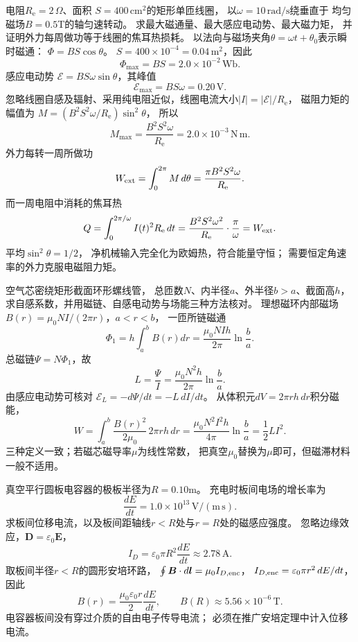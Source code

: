 \problemtext 电阻$R_{\mathrm e}=2\,\Omega$、面积
$S=400\,\mathrm{cm^2}$的矩形单匝线圈，
以$\omega=10\,\mathrm{rad/s}$绕垂直于
均匀磁场$B=0.5$T的轴匀速转动。
求最大磁通量、最大感应电动势、最大磁力矩，
并证明外力每周做功等于线圈的焦耳热损耗。
\workings
以法向与磁场夹角$\theta=\omega t+\theta_0$表示瞬时磁通：
$\Phi=BS\cos\theta$。
$S=400\times10^{-4}=0.04\,\mathrm{m^2}$，因此
\[
\boxed{\Phi_{\max}=BS=2.0\times10^{-2}\,\mathrm{Wb}}.
\]
感应电动势
$\mathcal E=BS\omega\sin\theta$，其峰值
\[
\boxed{\mathcal E_{\max}=BS\omega=0.20\,\mathrm V}.
\]
忽略线圈自感及辐射、采用纯电阻近似，线圈电流大小$|I|=|\mathcal E|/R_{\mathrm e}$，
磁阻力矩的幅值为
$M=(B^2S^2\omega/R_{\mathrm e})\sin^2\theta$，
所以
\[
\boxed{M_{\max}=\frac{B^2S^2\omega}{R_{\mathrm e}}
=2.0\times10^{-3}\,\mathrm{N\,m}}.
\]
外力每转一周所做功
\[
W_{\rm ext}=\int_0^{2\pi}M\,d\theta
=\frac{\pi B^2S^2\omega}{R_{\mathrm e}}.
\]
而一周电阻中消耗的焦耳热
\[
Q=\int_0^{2\pi/\omega}I(t)^2R_{\mathrm e}\,dt
=\frac{B^2S^2\omega^2}{R_{\mathrm e}}
\cdot\frac\pi\omega=W_{\rm ext}.
\]
\crosscheck 平均$\sin^2\theta=1/2$，
净机械输入完全化为欧姆热，符合能量守恒；
需要恒定角速率的外力克服电磁阻力矩。

\problemtext 空气芯密绕矩形截面环形螺线管，
总匝数$N$、内半径$a$、外半径$b>a$、截面高$h$，
求自感系数，并用磁链、自感电动势与场能三种方法核对。
\workings
理想磁环内部磁场
$B(r)=\mu_0NI/(2\pi r)$，$a<r<b$，
一匝所链磁通
\[
\Phi_1=h\int_a^b B(r)dr
=\frac{\mu_0NIh}{2\pi}\ln\frac ba.
\]
总磁链$\Psi=N\Phi_1$，故
\[
\boxed{L=\frac\Psi I
=\frac{\mu_0N^2h}{2\pi}\ln\frac ba}.
\]
由感应电动势可核对
$\mathcal E_L=-d\Psi/dt=-L\,dI/dt$。
从体积元$dV=2\pi rh\,dr$积分磁能，
\[
W=\int_a^b\frac{B(r)^2}{2\mu_0}\,2\pi rh\,dr
=\frac{\mu_0N^2I^2h}{4\pi}\ln\frac ba
=\frac12LI^2.
\]
\crosscheck 三种定义一致；若磁芯磁导率$\mu$为线性常数，
把真空$\mu_0$替换为$\mu$即可，但磁滞材料一般不适用。

\problemtext 真空平行圆板电容器的极板半径为$R=0.10$m。
充电时板间电场的增长率为
\[
\frac{dE}{dt}=1.0\times10^{13}\,\mathrm{V/(m\,s)}.
\]
求板间位移电流，以及板间距轴线$r<R$处与$r=R$处的磁感应强度。
\workings
忽略边缘效应，$\bm D=\varepsilon_0\bm E$，
\[
\boxed{I_D=\varepsilon_0\pi R^2\frac{dE}{dt}
\approx2.78\,\mathrm A}.
\]
取板间半径$r<R$的圆形安培环路，
$\oint\bm B\cdot d\bm l=\mu_0I_{D,\rm enc}$，
$I_{D,\rm enc}=\varepsilon_0\pi r^2\,dE/dt$，因此
\[
\boxed{B(r)=\frac{\mu_0\varepsilon_0r}{2}\frac{dE}{dt}},
\qquad
\boxed{B(R)\approx5.56\times10^{-6}\,\mathrm T}.
\]
\crosscheck 电容器板间没有穿过介质的自由电子传导电流；
必须在推广安培定理中计入位移电流。

